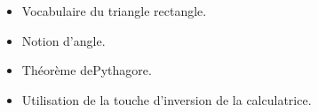 \begin{prerequis}[Prérequis]    
    \begin{itemize}
        \item Vocabulaire du triangle rectangle.
        \item Notion d'angle.
        \item Théorème dePythagore.
        \item Utilisation de la touche d'inversion de la calculatrice.
    \end{itemize}
\end{prerequis}
